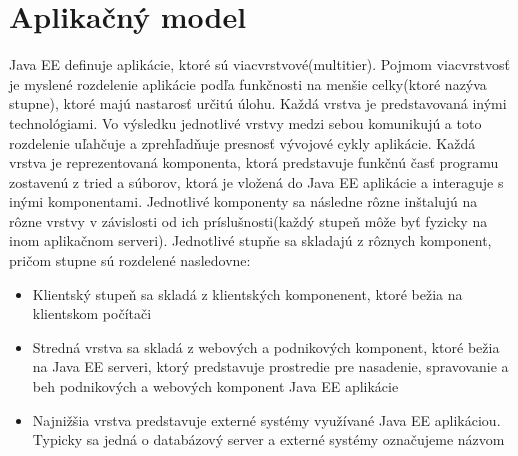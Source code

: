 \section{Aplikačný model}
Java EE definuje aplikácie, ktoré sú viacvrstvové(multitier). Pojmom viacvrstvosť je myslené rozdelenie aplikácie podľa funkčnosti na menšie celky(ktoré nazýva stupne), ktoré majú nastarosť určitú úlohu. Každá vrstva je predstavovaná inými technológiami. Vo výsledku jednotlivé vrstvy medzi sebou komunikujú a toto rozdelenie uľahčuje a zprehľadňuje presnosť vývojové cykly aplikácie. Každá vrstva je reprezentovaná komponenta, ktorá predstavuje funkčnú časť programu zostavenú z tried a súborov, ktorá je vložená do Java EE aplikácie a interaguje s inými komponentami\cite{Pravidla}. Jednotlivé komponenty sa následne rôzne inštalujú na rôzne vrstvy v závislosti od ich príslušnosti(každý stupeň môže byť fyzicky na inom aplikačnom serveri). Jednotlivé stupňe sa skladajú z rôznych komponent, pričom stupne sú rozdelené nasledovne:
\begin{itemize}
\item Klientský stupeň sa skladá z klientských komponenent, ktoré bežia na klientskom počítači
\item Stredná vrstva sa skladá z webových a podnikových komponent, ktoré bežia na Java EE serveri, ktorý predstavuje prostredie pre nasadenie, spravovanie a beh podnikových a webových komponent Java EE aplikácie
\item Najnižšia vrstva predstavuje externé systémy využívané Java EE aplikáciou. Typicky sa jedná o databázový server a externé systémy označujeme názvom 
\end{itemize}

